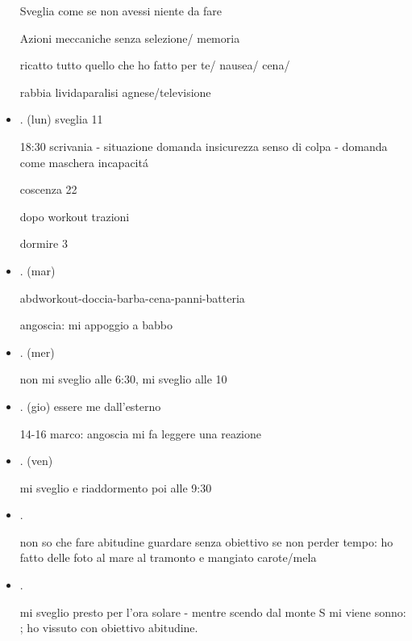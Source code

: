 \begin{itemize}
Sveglia come se non avessi niente da fare

Azioni meccaniche senza selezione/ memoria

ricatto tutto quello che ho fatto per te/ nausea/ cena/

rabbia lividaparalisi agnese/televisione

\item {}.
(lun)
sveglia 11

18:30 scrivania - situazione domanda insicurezza senso di colpa - domanda come maschera incapacit\'a

coscenza 22

dopo workout trazioni

dormire 3

\item {}.
(mar)



abdworkout-doccia-barba-cena-panni-batteria

angoscia: mi appoggio a babbo

\item {}.
(mer)

non mi sveglio alle 6:30, mi sveglio alle 10


\item {}.
(gio) essere me dall'esterno

14-16 marco: angoscia mi fa leggere una reazione


\item {}.
(ven)

mi sveglio e riaddormento poi alle 9:30


\item {}.

non so che fare abitudine guardare senza obiettivo se non perder tempo: ho fatto delle foto al mare al tramonto e mangiato carote/mela

\item {}.

mi sveglio presto per l'ora solare - mentre scendo dal monte S mi viene sonno: ; ho vissuto con obiettivo abitudine.


\end{itemize}
